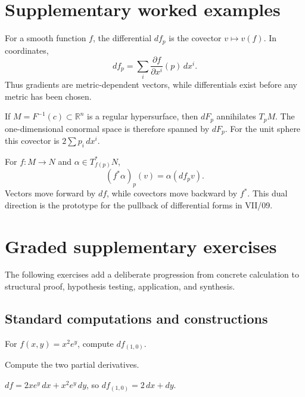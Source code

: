 \section{Supplementary worked examples}
\label{sec:vii05-pedagogy}

\begin{example}\label{ex:vii05-ped-01}
For a smooth function \(f\), the differential \(df_p\) is the covector \(v\mapsto v(f)\).  In coordinates,
\[
df_p=\sum_i \frac{\partial f}{\partial x^i}(p)\,dx^i.
\]
Thus gradients are metric-dependent vectors, while differentials exist before any metric has been chosen.
\end{example}

\begin{example}\label{ex:vii05-ped-02}
If \(M=F^{-1}(c)\subset\mathbb R^n\) is a regular hypersurface, then \(dF_p\) annihilates \(T_pM\).  The one-dimensional conormal space is therefore spanned by \(dF_p\).  For the unit sphere this covector is \(2\sum p_i\,dx^i\).
\end{example}

\begin{example}\label{ex:vii05-ped-03}
For \(f:M\to N\) and \(\alpha\in T^*_{f(p)}N\),
\[
(f^*\alpha)_p(v)=\alpha(df_pv).
\]
Vectors move forward by \(df\), while covectors move backward by \(f^*\).  This dual direction is the prototype for the pullback of differential forms in VII/09.
\end{example}

\section{Graded supplementary exercises}
The following exercises add a deliberate progression from concrete calculation to structural proof, hypothesis testing, application, and synthesis.

\subsection*{Standard computations and constructions}

\begin{exercise}\label{exr:vii05-ped-01}
For \(f(x,y)=x^2e^y\), compute \(df_{(1,0)}\).
\end{exercise}
\begin{hint}
Compute the two partial derivatives.
\end{hint}
\begin{solution}
\(df=2xe^y\,dx+x^2e^y\,dy\), so \(df_{(1,0)}=2\,dx+dy\).
\end{solution}

